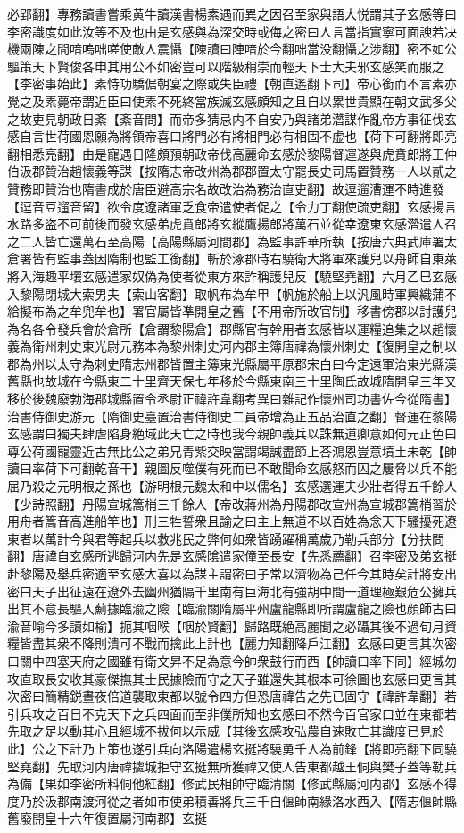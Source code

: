 必郢翻】專務讀書嘗乘黄牛讀漢書楊素遇而異之因召至家與語大悦謂其子玄感等曰李密識度如此汝等不及也由是玄感與為深交時或侮之密曰人言當指實寧可面諛若决機兩陳之間喑嗚咄嗟使敵人震懾【陳讀曰陣喑於今翻咄當没翻懾之涉翻】密不如公驅策天下賢俊各申其用公不如密豈可以階級稍崇而輕天下士大夫邪玄感笑而服之【李密事始此】素恃功驕倨朝宴之際或失臣禮【朝直遙翻下司】帝心銜而不言素亦覺之及素薨帝謂近臣曰使素不死終當族滅玄感頗知之且自以累世貴顯在朝文武多父之故吏見朝政日紊【紊音問】而帝多猜忌内不自安乃與諸弟濳謀作亂帝方事征伐玄感自言世荷國恩願為將領帝喜曰將門必有將相門必有相固不虚也【荷下可翻將即亮翻相悉亮翻】由是寵遇日隆頗預朝政帝伐高麗命玄感於黎陽督運遂與虎賁郎將王仲伯汲郡贊治趙懷義等謀【按隋志帝改州為郡郡置太守罷長史司馬置贊務一人以貳之贊務即贊治也隋書成於唐臣避高宗名故改治為務治直吏翻】故逗遛漕運不時進發【逗音豆遛音留】欲令度遼諸軍乏食帝遣使者促之【令力丁翻使疏吏翻】玄感揚言水路多盗不可前後而發玄感弟虎賁郎將玄縱鷹揚郎將萬石並從幸遼東玄感濳遣人召之二人皆亡還萬石至高陽【高陽縣屬河間郡】為監事許華所執【按唐六典武庫署太倉署皆有監事蓋因隋制也監工銜翻】斬於涿郡時右驍衛大將軍來護兒以舟師自東萊將入海趣平壤玄感遣家奴偽為使者從東方來詐稱護兒反【驍堅堯翻】六月乙巳玄感入黎陽閉城大索男夫【索山客翻】取帆布為牟甲【帆施於船上以汎風時軍興織蒲不給擬布為之牟兜牟也】署官屬皆凖開皇之舊【不用帝所改官制】移書傍郡以討護兒為名各令發兵會於倉所【倉謂黎陽倉】郡縣官有幹用者玄感皆以運糧追集之以趙懷義為衛州刺史東光尉元務本為黎州刺史河内郡主簿唐禕為懷州刺史【復開皇之制以郡為州以太守為刺史隋志州郡皆置主簿東光縣屬平原郡宋白曰今定遠軍治東光縣漢舊縣也故城在今縣東二十里齊天保七年移於今縣東南三十里陶氏故城隋開皇三年又移於後魏廢勃海郡城縣置令丞尉正禕許韋翻考異曰雜記作懷州司功書佐今從隋書】治書侍御史游元【隋御史臺置治書侍御史二員帝增為正五品治直之翻】督運在黎陽玄感謂曰獨夫肆虐陷身絶域此天亡之時也我今親帥義兵以誅無道卿意如何元正色曰尊公荷國寵靈近古無比公之弟兄青紫交映當謂竭誠盡節上荅鴻恩豈意墳土未乾【帥讀曰率荷下可翻乾音干】親圖反噬僕有死而已不敢聞命玄感怒而囚之屢脅以兵不能屈乃殺之元明根之孫也【游明根元魏太和中以儒名】玄感選運夫少壯者得五千餘人【少詩照翻】丹陽宣城篙梢三千餘人【帝改蔣州為丹陽郡改宣州為宣城郡篙梢習於用舟者篙音高進船竿也】刑三牲誓衆且諭之曰主上無道不以百姓為念天下騷擾死遼東者以萬計今與君等起兵以救兆民之弊何如衆皆踴躍稱萬歲乃勒兵部分【分扶問翻】唐禕自玄感所逃歸河内先是玄感隂遣家僮至長安【先悉薦翻】召李密及弟玄挺赴黎陽及舉兵密適至玄感大喜以為謀主謂密曰子常以濟物為己任今其時矣計將安出密曰天子出征遠在遼外去幽州猶隔千里南有巨海北有強胡中間一道理極艱危公擁兵出其不意長驅入薊據臨渝之險【臨渝關隋屬平州盧龍縣即所謂盧龍之險也顔師古曰渝音喻今多讀如榆】扼其咽喉【咽於賢翻】歸路既絶高麗聞之必躡其後不過旬月資糧皆盡其衆不降則潰可不戰而擒此上計也【麗力知翻降戶江翻】玄感曰更言其次密曰關中四塞天府之國雖有衛文昇不足為意今帥衆鼓行而西【帥讀曰率下同】經城勿攻直取長安收其豪傑撫其士民據險而守之天子雖還失其根本可徐圖也玄感曰更言其次密曰簡精鋭晝夜倍道襲取東都以號令四方但恐唐禕告之先已固守【禕許韋翻】若引兵攻之百日不克天下之兵四面而至非僕所知也玄感曰不然今百官家口並在東都若先取之足以動其心且經城不拔何以示威【其後玄感攻弘農自速敗亡其識度已見於此】公之下計乃上策也遂引兵向洛陽遣楊玄挺將驍勇千人為前鋒【將即亮翻下同驍堅堯翻】先取河内唐禕㨿城拒守玄挺無所獲禕又使人告東都越王侗與樊子蓋等勒兵為備【果如李密所料侗他紅翻】修武民相帥守臨清關【修武縣屬河内郡】玄感不得度乃於汲郡南渡河從之者如市使弟積善將兵三千自偃師南緣洛水西入【隋志偃師縣舊廢開皇十六年復置屬河南郡】玄挺